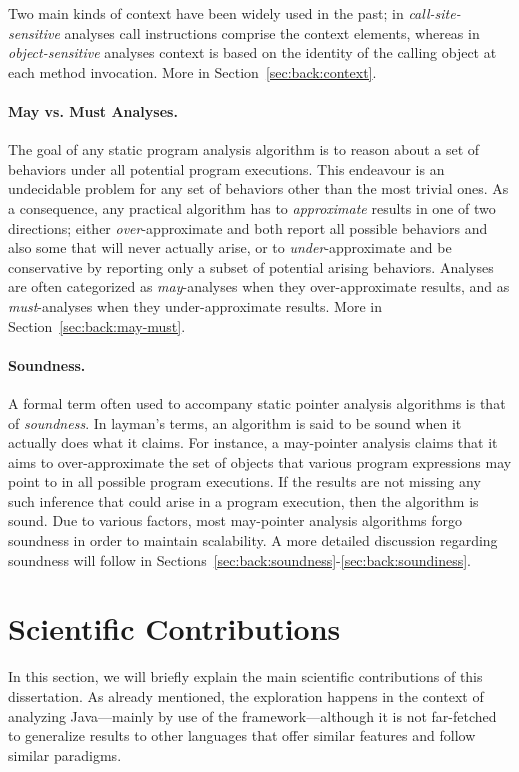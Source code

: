 Two main kinds of context have been widely used in the past; in \emph{call-site-sensitive} analyses call instructions comprise the context elements, whereas in \emph{object-sensitive} analyses context is based on the identity of the calling object at each method invocation. More in Section~\ref{sec:back:context}.


\paragraph*{May vs. Must Analyses.}
The goal of any static program analysis algorithm is to reason about a set of behaviors under all potential program executions. This endeavour is an undecidable problem for any set of behaviors other than the most trivial ones. As a consequence, any practical algorithm has to \emph{approximate} results in one of two directions; either \emph{over}-approximate and both report all possible behaviors and also some that will never actually arise, or to \emph{under}-approximate and be conservative by reporting only a subset of potential arising behaviors. Analyses are often categorized as \emph{may}-analyses when they over-approximate results, and as \emph{must}-analyses when they under-approximate results. More in Section~\ref{sec:back:may-must}.


\paragraph*{Soundness.}
A formal term often used to accompany static pointer analysis algorithms is that of \emph{soundness}. In layman's terms, an algorithm is said to be sound when it actually does what it claims. For instance, a may-pointer analysis claims that it aims to over-approximate the set of objects that various program expressions may point to in all possible program executions. If the results are not missing any such inference that could arise in a program execution, then the algorithm is sound. Due to various factors, most may-pointer analysis algorithms forgo soundness in order to maintain scalability. A more detailed discussion regarding soundness will follow in Sections~\ref{sec:back:soundness}-\ref{sec:back:soundiness}.



\section{Scientific Contributions}

In this section, we will briefly explain the main scientific contributions of this dissertation. As already mentioned, the exploration happens in the context of analyzing Java---mainly by use of the \doop{} framework---although it is not far-fetched to generalize results to other languages that offer similar features and follow similar paradigms.

